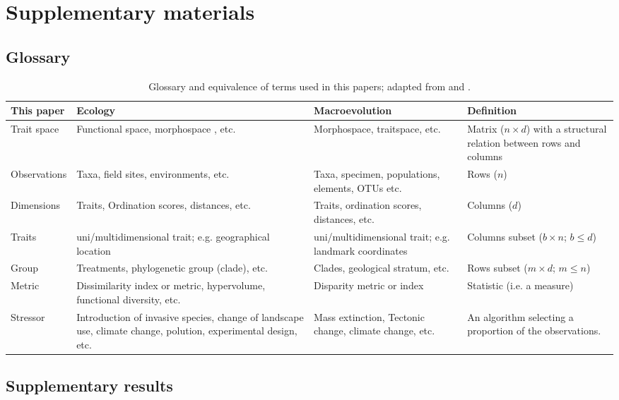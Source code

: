 \documentclass[12pt,letterpaper]{article}
\begin{document}
\section{Supplementary materials}

\subsection{Glossary}


\begin{table}[ht]
\caption{Glossary and equivalence of terms used in this papers; adapted from \cite{guillerme2020shifting} and \cite{mammola2021concepts}.}
\centering
\begin{tabular}{p{4cm}p{5cm}p{5cm}p{3cm}}
This paper & Ecology & Macroevolution & Definition \\
\hline
Trait space & Functional space, morphospace , etc. & Morphospace, traitspace, etc. & Matrix ($n \times d$) with a structural relation between rows and columns  \\
\hline
Observations & Taxa, field sites, environments, etc. & Taxa, specimen, populations, elements, OTUs etc. & Rows ($n$) \\
\hline
Dimensions & Traits, Ordination scores, distances, etc. & Traits, ordination scores, distances, etc. & Columns ($d$) \\
\hline
Traits & uni/multidimensional trait; e.g. geographical location & uni/multidimensional trait; e.g. landmark coordinates & Columns subset ($b \times n$; $b \leq d$) \\
\hline
Group & Treatments, phylogenetic group (clade), etc. & Clades, geological stratum, etc. & Rows subset ($m \times d$; $m \leq n$) \\
\hline
Metric  & Dissimilarity index or metric, hypervolume, functional diversity, etc. & Disparity metric or index & Statistic (i.e. a measure) \\
\hline
Stressor & Introduction of invasive species, change of landscape use, climate change, polution, experimental design, etc. & Mass extinction, Tectonic change, climate change, etc. & An algorithm selecting a proportion of the observations.
\end{tabular}
\end{table}



\subsection{Supplementary results}
\end{document}
